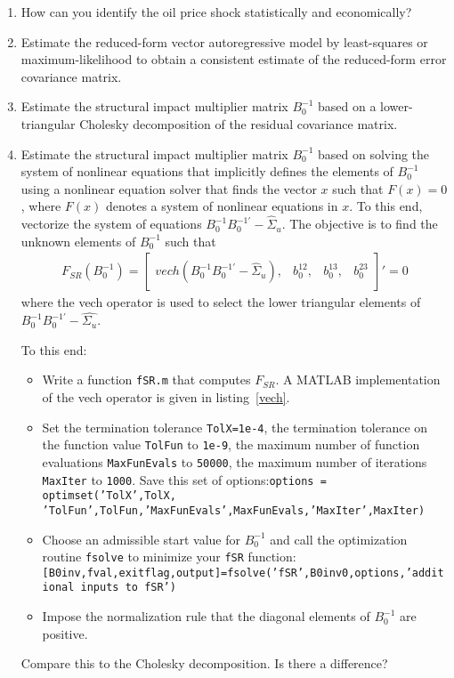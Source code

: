 \begin{enumerate}
\item How can you identify the oil price shock statistically and economically?

\item Estimate the reduced-form vector autoregressive model by least-squares or maximum-likelihood
to obtain a consistent estimate of the reduced-form error covariance matrix.

\item Estimate the structural impact multiplier matrix \(B_0^{-1}\)
based on a lower-triangular Cholesky decomposition of the residual covariance matrix.

\item Estimate the structural impact multiplier matrix \(B_0^{-1}\)
based on solving the system of nonlinear equations that implicitly defines the elements of \(B_0^{-1}\)
using a nonlinear equation solver that finds the vector \(x\) such that \(F(x)=0\),
where \(F(x)\) denotes a system of nonlinear equations in \(x\).
To this end, vectorize the system of equations \(B_0^{-1} B_{0}^{-1'} - \hat{\Sigma}_u\).
The objective is to find the unknown elements of \(B_0^{-1}\) such that
\begin{align*}
  F_{SR}(B_0^{-1}) = \begin{bmatrix} vech\left(B_0^{-1} B_0^{-1'} - \hat{\Sigma}_u\right),&b_0^{12},&b_0^{13},&b_0^{23}\end{bmatrix}'=0
\end{align*}
where the vech operator is used to select the lower triangular elements of \(B_0^{-1}B_0^{-1'} - \hat{\Sigma_u}\).

To this end:
\begin{itemize}
\item Write a function \texttt{fSR.m} that computes \(F_{SR}\).
A MATLAB implementation of the vech operator is given in listing~\ref{vech}.
\item Set the termination tolerance \texttt{TolX=1e-4}, the termination tolerance on the function value \texttt{TolFun} to \texttt{1e-9},
the maximum number of function evaluations \texttt{MaxFunEvals} to \texttt{50000},
the maximum number of iterations \texttt{MaxIter} to \texttt{1000}.
Save this set of options:\texttt{options = optimset('TolX',TolX,\\'TolFun',TolFun,'MaxFunEvals',MaxFunEvals,'MaxIter',MaxIter)}
\item Choose an admissible start value for \(B_0^{-1}\)
and call the optimization routine \texttt{fsolve} to minimize your \texttt{fSR} function:\\
\texttt{[B0inv,fval,exitflag,output]=fsolve('fSR',B0inv0,options,'additional inputs to fSR')}
\item Impose the normalization rule that the diagonal elements of \(B_0^{-1}\) are positive.
\end{itemize}
Compare this to the Cholesky decomposition. Is there a difference?
 	

\end{enumerate}
